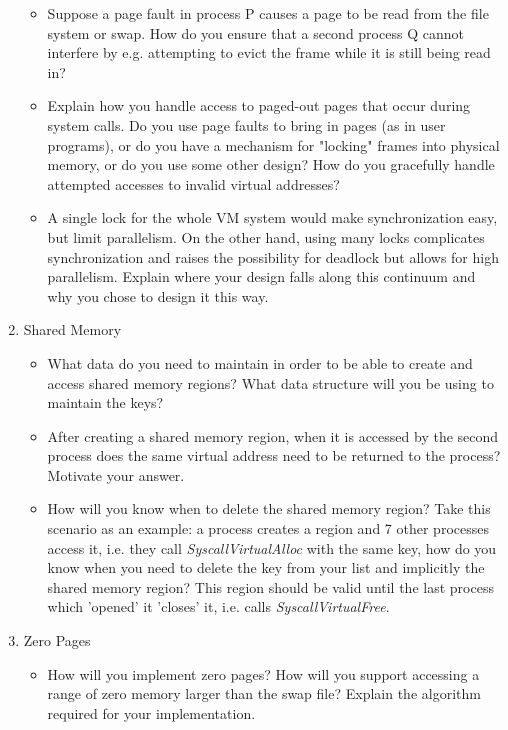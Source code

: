 \begin{enumerate}
\begin{itemize}
            \item Suppose a page fault in process P causes a page to be read from the file system or swap. How do you ensure that a second process Q cannot interfere by e.g. attempting to evict the frame while it is still being read in?
            
            \item Explain how you handle access to paged-out pages that occur during system calls.  Do you use page faults to bring in pages (as in user programs), or do you have a mechanism for "locking" frames into physical memory, or do you use some other design?  How do you gracefully handle attempted accesses to invalid virtual addresses?

            \item  A single lock for the whole VM system would make synchronization easy, but limit parallelism.  On the other hand, using many locks complicates synchronization and raises the possibility for deadlock but allows for high parallelism.  Explain where your design falls along this continuum and why you chose to design it this way.
        \end{itemize}

    
    \item Shared Memory
        \begin{itemize}
            \item What data do you need to maintain in order to be able to create and access shared memory regions? What data structure will you be using to maintain the keys?
			
			\item After creating a shared memory region, when it is accessed by the second process does the same virtual address need to be returned to the process? Motivate your answer.
			
			\item How will you know when to delete the shared memory region? Take this scenario as an example: a process creates a region and 7 other processes access it, i.e. they call \textit{SyscallVirtualAlloc} with the same key, how do you know when you need to delete the key from your list and implicitly the shared memory region? This region should be valid until the last process which 'opened' it 'closes' it, i.e. calls \textit{SyscallVirtualFree}.
        \end{itemize}

    \item Zero Pages
        \begin{itemize}
            \item How will you implement zero pages? How will you support accessing a range of zero memory larger than the swap file? Explain the algorithm required for your implementation.
        \end{itemize}

\end{enumerate}


